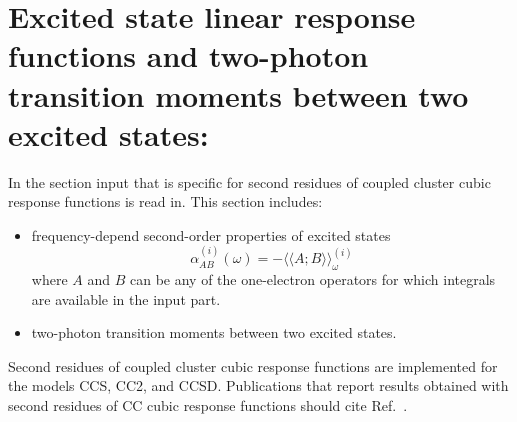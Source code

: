 
\section{Excited state linear response functions and
         two-photon transition moments between two excited states:
         }
\label{sec:ccexlr}

In the  section input that is specific for 
second residues of coupled cluster cubic response functions 
is read in.
This section includes:
\begin{itemize}
\item frequency-depend second-order properties of excited states
      $$ \alpha^{(i)}_{AB}(\omega) = 
         -\langle\langle A; B\rangle\rangle^{(i)}_\omega $$
      where $A$ and $B$ can be any of the one-electron operators
      for which integrals  are available in the 
      input part.
\item two-photon transition moments between two excited states.
\end{itemize}
Second residues of coupled cluster cubic response functions are
implemented for the models CCS, CC2, and CCSD.
Publications that report results obtained with second residues
of CC cubic response functions should cite Ref.\ \cite{Haettig:EXLR}.

